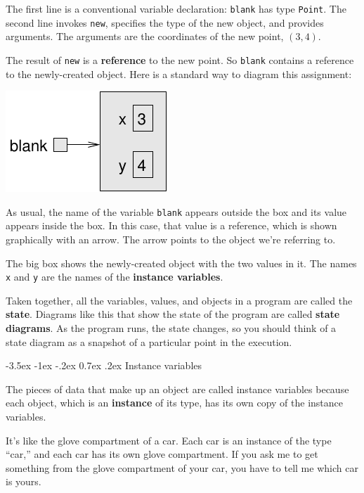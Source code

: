 \documentclass[12pt]{book}
\makeatletter
\renewcommand{\section}{\@startsection {section}{1}{\z@}%
    {-3.5ex \@plus -1ex \@minus -.2ex}%
    {0.7ex \@plus.2ex}%
    {\normalfont\Large\bfseries}}
\theoremstyle{exercise}
\newcommand{\java}[1]{\lstinline{#1}} %
\makeatother
\begin{document}

The first line is a conventional variable declaration: \java{blank} has type \java{Point}.
The second line invokes \java{new}, specifies the type of the new object, and provides arguments.
The arguments are the coordinates of the new point, $(3, 4)$.


The result of \java{new} is a {\bf reference} to the new point.
So \java{blank} contains a reference to the newly-created object.
Here is a standard way to diagram this assignment:

\includegraphics{figs/reference.pdf}

As usual, the name of the variable \java{blank} appears outside the box and its value appears inside the box.
In this case, that value is a reference, which is shown graphically with an arrow.
The arrow points to the object we're referring to.


The big box shows the newly-created object with the two values in it.
The names \java{x} and \java{y} are the names of the {\bf instance variables}.


Taken together, all the variables, values, and objects in a program are called the {\bf state}.
Diagrams like this that show the state of the program are called {\bf state diagrams}.
As the program runs, the state changes, so you should think of a state diagram as a snapshot of a particular point in the execution.


\section{Instance variables}

The pieces of data that make up an object are called instance variables because each object, which is an {\bf instance} of its type, has its own copy of the instance variables.

It's like the glove compartment of a car.  Each car is an instance of the type ``car,'' and each car has its own glove compartment.
If you ask me to get something from the glove compartment of your car, you have to tell me which car is yours.
\end{document}
